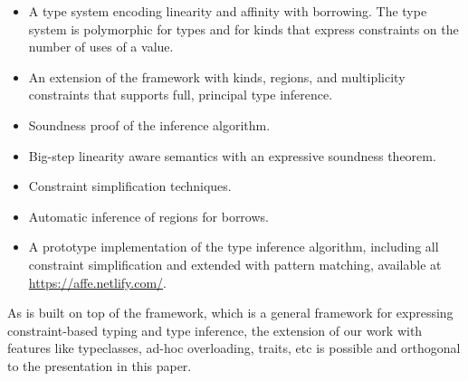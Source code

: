 \begin{itemize}
\item A type system encoding linearity and affinity with
  borrowing. The type system is polymorphic for types and
  for kinds that express constraints on the number of uses of a value.
\item An extension of the \hmx framework
  \cite{DBLP:journals/tapos/OderskySW99} with kinds, regions, and
  multiplicity constraints that supports full, principal type inference.
\item Soundness proof of the inference algorithm.
\item Big-step linearity aware semantics with an expressive soundness theorem.
\item Constraint simplification techniques.
\item Automatic inference of regions for borrows.
\item A prototype implementation of the type inference algorithm, including all
  constraint simplification and extended with pattern matching,
  available at \url{https://affe.netlify.com/}.
\end{itemize}

As \lang{} is built on top of the \hmx{} framework, which is a general
framework for expressing constraint-based typing and type inference,
the extension of our work with features like typeclasses, ad-hoc overloading,
traits, etc is possible and orthogonal to the presentation in this paper. 


